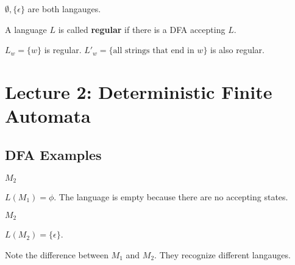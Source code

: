 \documentclass[11pt,a4paper]{article}
\begin{document}
\begin{example}
    $\emptyset,\{\epsilon\}$ are both langauges.
\end{example}

\begin{definition}
    A language $L$ is called \textbf{regular} if there is a DFA accepting $L$.
\end{definition}

\begin{example}
    $L_w=\{w\}$ is regular. $L'_w=\{\text{all strings that end in }w\}$ is also regular.
\end{example}





\section{Lecture 2: Deterministic Finite Automata}
\subsection{DFA Examples}
\begin{example} $M_2$


    $L(M_1)=\phi$. The language is empty because there are no accepting states.
\end{example}

\begin{example} $M_2$


    $L(M_2)=\{\epsilon\}$.
    
    Note the difference between $M_1$ and $M_2$. They recognize different langauges.
\end{example}
\end{document}
